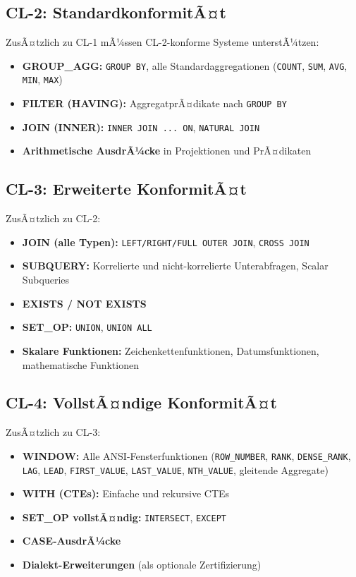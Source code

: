 \subsection{CL-2: StandardkonformitÃ¤t}
\label{subsec:cl2}

ZusÃ¤tzlich zu CL-1 mÃ¼ssen CL-2-konforme Systeme unterstÃ¼tzen:

\begin{itemize}[leftmargin=1.5cm]
  \item \textbf{GROUP\_AGG:} \texttt{GROUP BY}, alle Standardaggregationen (\texttt{COUNT}, \texttt{SUM}, \texttt{AVG}, \texttt{MIN}, \texttt{MAX})
  \item \textbf{FILTER (HAVING):} AggregatprÃ¤dikate nach \texttt{GROUP BY}
  \item \textbf{JOIN (INNER):} \texttt{INNER JOIN ... ON}, \texttt{NATURAL JOIN}
  \item \textbf{Arithmetische AusdrÃ¼cke} in Projektionen und PrÃ¤dikaten
\end{itemize}

\subsection{CL-3: Erweiterte KonformitÃ¤t}
\label{subsec:cl3}

ZusÃ¤tzlich zu CL-2:

\begin{itemize}[leftmargin=1.5cm]
  \item \textbf{JOIN (alle Typen):} \texttt{LEFT/RIGHT/FULL OUTER JOIN}, \texttt{CROSS JOIN}
  \item \textbf{SUBQUERY:} Korrelierte und nicht-korrelierte Unterabfragen, Scalar Subqueries
  \item \textbf{EXISTS / NOT EXISTS}
  \item \textbf{SET\_OP:} \texttt{UNION}, \texttt{UNION ALL}
  \item \textbf{Skalare Funktionen:} Zeichenkettenfunktionen, Datumsfunktionen, mathematische Funktionen
\end{itemize}

\subsection{CL-4: VollstÃ¤ndige KonformitÃ¤t}
\label{subsec:cl4}

ZusÃ¤tzlich zu CL-3:

\begin{itemize}[leftmargin=1.5cm]
  \item \textbf{WINDOW:} Alle ANSI-Fensterfunktionen (\texttt{ROW\_NUMBER}, \texttt{RANK}, \texttt{DENSE\_RANK}, \texttt{LAG}, \texttt{LEAD}, \texttt{FIRST\_VALUE}, \texttt{LAST\_VALUE}, \texttt{NTH\_VALUE}, gleitende Aggregate)
  \item \textbf{WITH (CTEs):} Einfache und rekursive CTEs
  \item \textbf{SET\_OP vollstÃ¤ndig:} \texttt{INTERSECT}, \texttt{EXCEPT}
  \item \textbf{CASE-AusdrÃ¼cke}
  \item \textbf{Dialekt-Erweiterungen} (als optionale Zertifizierung)
\end{itemize}

